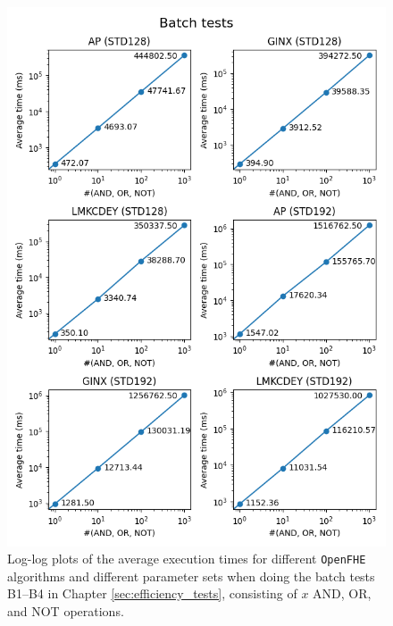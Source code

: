 \begin{figure}[ht]
    \centering
    \includegraphics[width=\textwidth]{data/figures/batch_1.png}
    \caption{Log-log plots of the average execution times for different \texttt{OpenFHE} algorithms and different parameter sets when doing the batch tests B1--B4 in Chapter \ref{sec:efficiency_tests}, consisting of $x$ AND, OR, and NOT operations.}
    \label{fig:batch1}
\end{figure}

